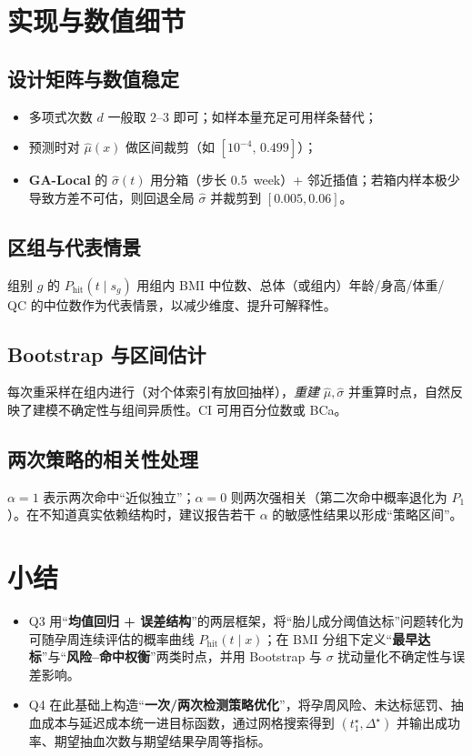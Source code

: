 \documentclass[11pt,a4paper]{article}
\begin{document}
\section{实现与数值细节}
\subsection{设计矩阵与数值稳定}
\begin{itemize}
  \item 多项式次数 $d$ 一般取 $2$--$3$ 即可；如样本量充足可用样条替代；
  \item 预测时对 $\widehat{\mu}(x)$ 做区间裁剪（如 $[10^{-4},\,0.499]$）；
  \item \textbf{GA-Local} 的 $\widehat{\sigma}(t)$ 用分箱（步长 \SI{0.5}{week}）+ 邻近插值；若箱内样本极少导致方差不可估，则回退全局 $\hat\sigma$ 并裁剪到 $[0.005,0.06]$。
\end{itemize}

\subsection{区组与代表情景}
组别 $g$ 的 $P_{\text{hit}}(t\mid s_g)$ 用组内 BMI 中位数、总体（或组内）年龄/身高/体重/ QC 的中位数作为代表情景，以减少维度、提升可解释性。

\subsection{Bootstrap 与区间估计}
每次重采样在组内进行（对个体索引有放回抽样），\emph{重建} $\widehat{\mu},\widehat{\sigma}$ 并重算时点，自然反映了建模不确定性与组间异质性。CI 可用百分位数或 BCa。

\subsection{两次策略的相关性处理}
$\alpha=1$ 表示两次命中“近似独立”；$\alpha=0$ 则两次强相关（第二次命中概率退化为 $P_1$）。在不知道真实依赖结构时，建议报告若干 $\alpha$ 的敏感性结果以形成“策略区间”。

\section{小结}
\begin{itemize}
  \item Q3 用“\textbf{均值回归 + 误差结构}”的两层框架，将“胎儿成分阈值达标”问题转化为可随孕周连续评估的概率曲线 $P_{\text{hit}}(t\mid x)$；在 BMI 分组下定义“\textbf{最早达标}”与“\textbf{风险--命中权衡}”两类时点，并用 Bootstrap 与 $\sigma$ 扰动量化不确定性与误差影响。
  \item Q4 在此基础上构造“\textbf{一次/两次检测策略优化}”，将孕周风险、未达标惩罚、抽血成本与延迟成本统一进目标函数，通过网格搜索得到 $(t_1^\star,\Delta^\star)$ 并输出成功率、期望抽血次数与期望结果孕周等指标。
\end{itemize}
\end{document}
